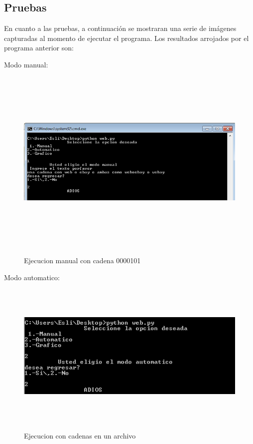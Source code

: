 \documentclass[12pt]{article}
\begin{document}
\subsection{Pruebas}
En cuanto a las pruebas, a continuación se mostraran una serie de imágenes capturadas al momento de ejecutar el programa. Los resultados arrojados por el programa anterior son:

Modo manual:

\begin{figure}[H]
\includegraphics[width=\textwidth, height=9cm]{manual_web}
\label{fig:manual_afn}
\caption{Ejecucion manual con cadena 0000101}
\end{figure}

Modo automatico:

\begin{figure}[H]
\includegraphics[width=15cm, height=7cm]{auto_web}
\label{fig:manual_afn}
\caption{Ejecucion con cadenas en un archivo }
\end{figure}
\end{document}
